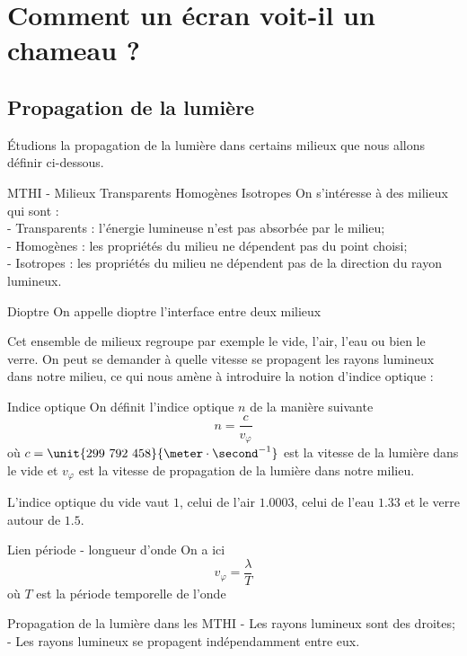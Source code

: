 \documentclass{classe}
\begin{document}
\section{Comment un écran voit-il un chameau ?}
\subsection{Propagation de la lumière}
Étudions la propagation de la lumière dans certains milieux que nous allons définir ci-dessous.
\begin{définition}{MTHI - Milieux Transparents Homogènes Isotropes}{}
On s'intéresse à des milieux qui sont :\\
- Transparents : l'énergie lumineuse n'est pas absorbée par le milieu;\\
- Homogènes : les propriétés du milieu ne dépendent pas du point choisi;\\
- Isotropes : les propriétés du milieu ne dépendent pas de la direction du rayon lumineux.
\end{définition}
\begin{définition}{Dioptre}{}
On appelle dioptre l'interface entre deux milieux
\end{définition}
Cet ensemble de milieux regroupe par exemple le vide, l'air, l'eau ou bien le verre. On peut se demander à quelle vitesse se propagent les rayons lumineux dans notre milieu, ce qui nous amène à introduire la notion d'indice optique :
\begin{définition}{Indice optique}{}
On définit l'indice optique $n$ de la manière suivante
\begin{equation*}
	n=\frac{c}{v_\varphi}
\end{equation*}
où $c =\unit{299~792~458}{\meter\cdot\second^{-1}}$ est la vitesse de la lumière dans le vide et $v_\varphi$ est la vitesse de propagation de la lumière dans notre milieu.
\end{définition}
\begin{example}
	L'indice optique du vide vaut $1$, celui de l'air $1.0003$, celui de l'eau $1.33$ et le verre autour de $1.5$.
\end{example}
\begin{remarque}{Lien période - longueur d'onde}{}
	On a ici
	\begin{equation*}
		v_\varphi = \frac{\lambda}{T}
	\end{equation*}
	où $T$ est la période temporelle de l'onde
\end{remarque}
\begin{théorème}{Propagation de la lumière dans les MTHI}{}
- Les rayons lumineux sont des droites;\\
- Les rayons lumineux se propagent indépendamment entre eux.
\end{théorème}
\end{document}
